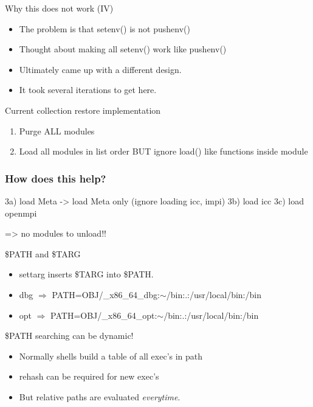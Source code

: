 \documentclass{beamer}
\begin{document}
\begin{frame}{Why this does not work (IV)}
  \begin{itemize}
    \item The problem is that setenv() is not pushenv()
    \item Thought about making all setenv() work like pushenv()
    \item Ultimately came up with a different design. 
    \item It took several iterations to get here.
  \end{itemize}
\end{frame}

\begin{frame}{Current collection restore implementation}
  \begin{enumerate}
    \item Purge ALL modules
    \item Load all modules in list order BUT ignore load() like
      functions inside module
  \end{enumerate}
\end{frame}

\begin{frame}[fragile]
  \frametitle{How does this help?}
    {\small
\begin{semiverbatim}
   
   3a) load Meta -> load Meta only (ignore loading icc, impi)
   3b) load icc
   3c) load openmpi

=> no modules to unload!!
\end{semiverbatim}
    }
\end{frame}

\begin{frame}{\$PATH and \$TARG}
  \begin{itemize}
    \item settarg inserts \$TARG into \$PATH.
    \item dbg $\Rightarrow$ PATH=OBJ/\_x86\_64\_dbg:$\sim$/bin:.:/usr/local/bin:/bin
    \item opt $\Rightarrow$ PATH=OBJ/\_x86\_64\_opt:$\sim$/bin:.:/usr/local/bin:/bin
  \end{itemize}
\end{frame}

\begin{frame}{\$PATH searching can be dynamic!}
  \begin{itemize}
    \item Normally shells build a table of all exec's in path
    \item rehash can be required for new exec's
    \item But relative paths are evaluated \emph{everytime}.
  \end{itemize}
\end{frame}
\end{document}
